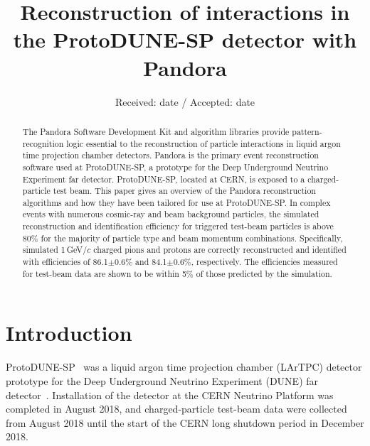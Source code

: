 \documentclass[epjc3]{svjour3}
\begin{document}
\title{Reconstruction of interactions in the ProtoDUNE-SP detector with Pandora}




\date{Received: date / Accepted: date}

\maketitle

\begin{abstract}
The Pandora Software Development Kit and algorithm libraries provide pattern-recognition logic essential to the reconstruction of particle interactions in liquid argon time projection chamber detectors. Pandora is the primary event reconstruction software used at ProtoDUNE-SP, a prototype for the Deep Underground Neutrino Experiment far detector. ProtoDUNE-SP, located at CERN, is exposed to a charged-particle test beam. This paper gives an overview of the Pandora reconstruction algorithms and how they have been tailored for use at ProtoDUNE-SP. In complex events with numerous cosmic-ray and beam background particles, the simulated reconstruction and identification efficiency for triggered test-beam particles is above 80\% for the majority of particle type and beam momentum combinations. Specifically, simulated 1\,GeV/$c$ charged pions and protons are correctly reconstructed and identified with efficiencies of 86.1$\pm0.6$\% and 84.1$\pm0.6$\%, respectively. The efficiencies measured for test-beam data are shown to be within 5\% of those predicted by the simulation.
\end{abstract}

\section{Introduction}
\label{sec:intro}
ProtoDUNE-SP~\cite{protoduneDetector} was a liquid argon time projection chamber (LArTPC) detector prototype for the Deep Underground Neutrino Experiment (DUNE) far detector~\cite{dunetdr_v1}. Installation of the detector at the CERN Neutrino Platform was completed in August 2018, and charged-particle test-beam data were collected from August 2018 until the start of the CERN long shutdown period in December 2018.
\end{document}
